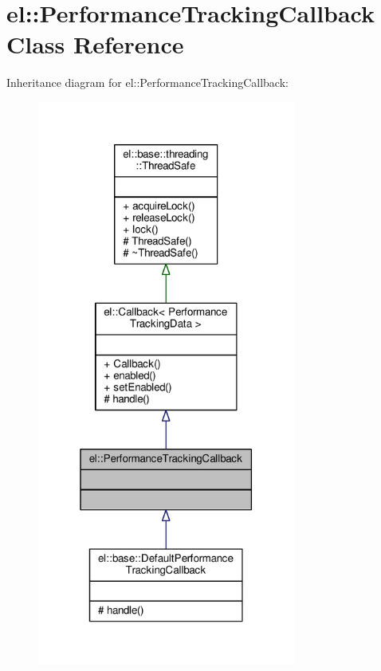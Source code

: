 \hypertarget{classel_1_1PerformanceTrackingCallback}{}\section{el\+:\+:Performance\+Tracking\+Callback Class Reference}
\label{classel_1_1PerformanceTrackingCallback}


Inheritance diagram for el\+:\+:Performance\+Tracking\+Callback\+:
\nopagebreak
\begin{figure}[H]
\begin{center}
\leavevmode
\includegraphics[width=241pt]{dd/d80/classel_1_1PerformanceTrackingCallback__inherit__graph}
\end{center}
\end{figure}



